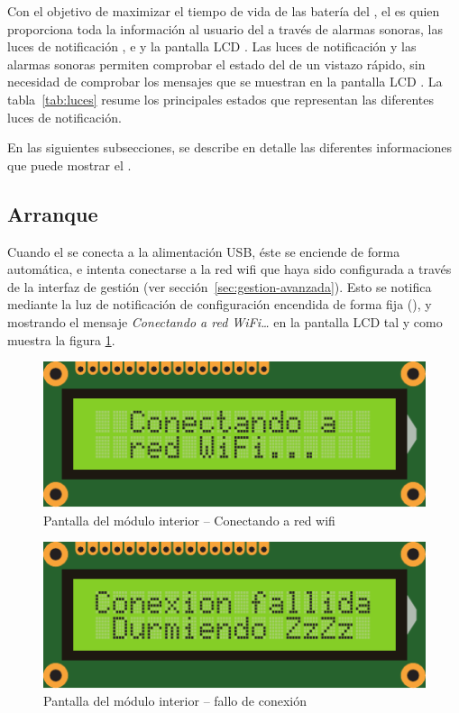 Con el objetivo de maximizar el tiempo de vida de las batería del \MEE, el \MIE es quien proporciona toda la información al usuario del \CMS a través de alarmas sonoras, las luces de notificación ,  e  y la pantalla LCD . Las luces de notificación y las alarmas sonoras permiten comprobar el estado del \CMS de un vistazo rápido, sin necesidad de comprobar los mensajes que se muestran en la pantalla LCD . La tabla~\ref{tab:luces} resume los principales estados que representan las diferentes luces de notificación.



En las siguientes subsecciones, se describe en detalle las diferentes informaciones que puede mostrar el \CMS.

\subsection{Arranque}

Cuando el \MIE se conecta a la alimentación USB, éste se enciende de forma automática, e intenta conectarse a la red wifi que haya sido configurada a través de la interfaz de gestión (ver sección~\ref{sec:gestion-avanzada}). Esto se notifica mediante la luz de notificación de configuración  encendida de forma fija (), y mostrando el mensaje \emph{Conectando a red WiFi\ldots} en la pantalla LCD  tal y como muestra la figura \ref{fig:screen-conn-process}.

\begin{figure}[!b]
  \centering
  \includegraphics[width=0.6\columnwidth]{images/screen-conn-process}
  \caption{Pantalla del módulo interior -- Conectando a red wifi}
  \label{fig:screen-conn-process}
\end{figure}

\begin{figure}[!b]
  \centering
  \includegraphics[width=0.6\columnwidth]{images/screen-conn-failed}
  \caption{Pantalla del módulo interior -- fallo de conexión}
  \label{fig:screen-conn-failed}
\end{figure}


